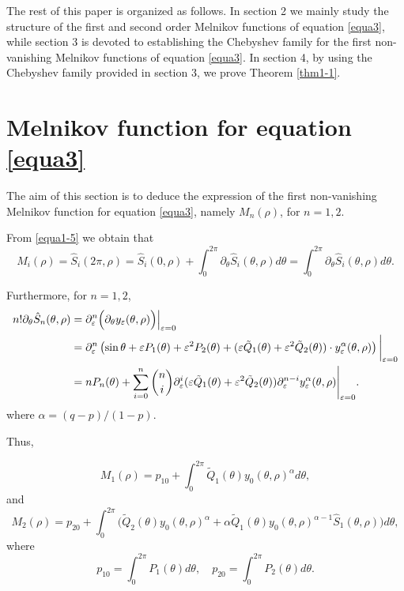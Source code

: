 \documentclass[11pt]{amsart}
\theoremstyle{remark}
\theoremstyle{definition}
\begin{document}
The rest of this paper is organized as follows. In section 2 we mainly study the structure of the first and second order  Melnikov functions of equation \eqref{equa3}, while   section 3 is devoted to  establishing the  Chebyshev family
for the first non-vanishing Melnikov functions of equation \eqref{equa3}.  In section 4, by using the  Chebyshev family provided in section 3, we prove Theorem  \ref{thm1-1}.






\section{Melnikov function for equation \eqref{equa3}}
The aim of this  section is to  deduce  the expression of the first  non-vanishing Melnikov function for  equation \eqref{equa3}, namely $M_n(\rho)$,  for $n=1,2$.






 From   \eqref{equa1-5}  we obtain that
  $$ M_{i}(\rho)=\hat{S}_{i}(2\pi,\rho)=\hat{S}_{i}(0,\rho)+\int_{0}^{2\pi}\partial_{\theta} \hat{S}_{i}(\theta,\rho)d \theta=\int_{0}^{2\pi}\partial_{\theta} \hat{S}_{i}(\theta,\rho)d \theta.$$


Furthermore, for $n=1,2$,
\begin{align}\label{equa4}
\begin{split}
n!\partial_{\theta}\hat{S}_{n}(\theta,\rho)&=\partial_{\varepsilon}^{n}\Big(\partial_{\theta}y_{\varepsilon}(\theta,\rho)\Big)\Big|_{\varepsilon=0}\\
&=\partial_{\varepsilon}^{n}\left(\sin \theta+\varepsilon P_1(\theta)+\varepsilon^2 P_2(\theta) +(\varepsilon \tilde{Q}_1(\theta)+\varepsilon^2 \tilde{Q}_2(\theta))\cdot y_{\varepsilon}^{\alpha}(\theta,\rho)\right)\bigg|_{\varepsilon=0}\\
&=nP_n(\theta)+\sum_{i=0}^{n}\dbinom{n}{i}\partial_{\varepsilon}^{i}(\varepsilon \tilde{Q}_1(\theta)+\varepsilon^2 \tilde{Q}_2(\theta))\partial_{\varepsilon}^{n-i} y_{\varepsilon}^{\alpha}(\theta,\rho) \Bigg|_{\varepsilon=0}.
\end{split}
\end{align}
where $\alpha=(q-p)/(1-p)$.

   Thus,

\begin{equation}\label{equa6}
M_{1}(\rho)=p_{10}+\int_{0}^{2\pi}\tilde{Q}_1(\theta)y_0(\theta,\rho)^{\alpha}d \theta,
\end{equation}
and
\begin{equation}\label{equa7}
M_{2}(\rho)=p_{20}+\int_{0}^{2\pi} \big(\tilde{Q}_2(\theta)y_0(\theta,\rho)^{\alpha}+\alpha\tilde{Q}_1(\theta)y_0(\theta,\rho)^{\alpha-1}\hat{S}_1(\theta,\rho)\big)d \theta,
\end{equation}
 where
\begin{equation*}
\label{equa7-01}p_{10}=\int_{0}^{2\pi}P_1(\theta)d \theta, \quad p_{20}=\int_{0}^{2\pi}P_2(\theta)d \theta.\end{equation*}
\end{document}
